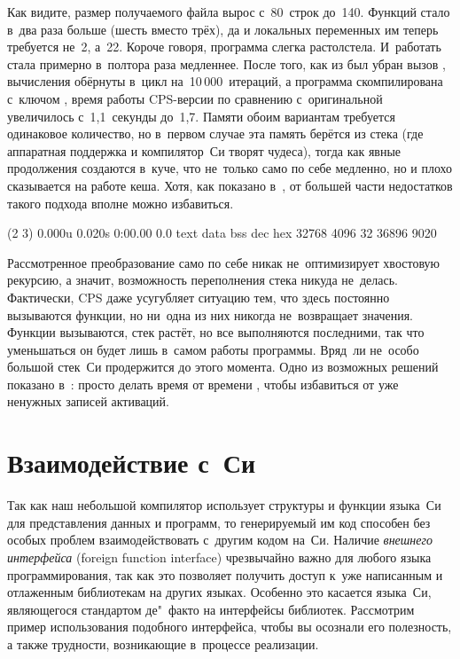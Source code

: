 Как видите, размер получаемого файла вырос с~80~строк до~140. Функций стало
в~два раза больше (шесть вместо трёх), да и локальных переменных им теперь
требуется не~2, а~22. Короче говоря, программа слегка растолстела. И~работать
стала примерно в~полтора раза медленнее. После того, как из  был убран
вызов , вычисления обёрнуты в~цикл на~10\,000~итераций, а
программа скомпилирована с~ключом , время работы CPS-версии по сравнению
с~оригинальной увеличилось с~\hbox{1,1}~секунды до~\hbox{1,7}. Памяти обоим
вариантам требуется одинаковое количество, но в~первом случае эта память берётся
из стека (где аппаратная поддержка и компилятор~Си творят чудеса), тогда как
явные продолжения создаются в~куче, что не~только само по себе медленно, но и
плохо сказывается на работе кеша. Хотя, как показано в~\cite{as94}, от большей
части недостатков такого подхода вполне можно избавиться.

\begin{shell}
(2 3)
0.000u 0.020s 0:00.00 0.0%
text    data    bss     dec     hex
32768   4096    32      36896   9020
\end{shell}

Рассмотренное преобразование само по себе никак не~оптимизирует хвостовую
рекурсию, а значит, возможность переполнения стека никуда не~делась. Фактически,
CPS даже усугубляет ситуацию тем, что здесь постоянно вызываются функции, но
ни~одна из них никогда не~возвращает значения. Функции вызываются, стек растёт,
но все  выполняются последними, так что уменьшаться он будет лишь
в~самом работы программы. Вряд~ли не~особо большой стек~Си продержится до этого
момента. Одно из возможных решений показано в~\cite{bak95}: просто делать время
от времени , чтобы избавиться от уже ненужных записей активаций.


\section{Взаимодействие с~Си}\label{cc/sect:ffi}

Так как наш небольшой компилятор использует структуры и функции языка~Си для
представления данных и программ, то генерируемый им код способен без особых
проблем взаимодействовать с~другим кодом на~Си. Наличие \emph{внешнего
интерфейса} (foreign function interface) чрезвычайно важно для любого языка
программирования, так как это позволяет получить доступ к~уже написанным
и отлаженным библиотекам на других языках. Особенно это касается языка~Си,
являющегося стандартом де"~факто на интерфейсы библиотек. Рассмотрим пример
использования подобного интерфейса, чтобы вы осознали его полезность, а также
трудности, возникающие в~процессе реализации.

